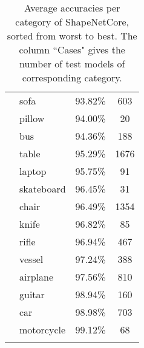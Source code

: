 \begin{table}[]
\begin{tabular}[t]{llcc}
		             & sofa              & 93.82\%           & 603            \\
		             & pillow            & 94.00\%           & 20             \\
		             & bus               & 94.36\%           & 188            \\
		             & table             & 95.29\%           & 1676           \\
		             & laptop            & 95.75\%           & 91             \\
		             & skateboard        & 96.45\%           & 31             \\
		             & chair             & 96.49\%           & 1354           \\
		             & knife             & 96.82\%           & 85             \\
		             & rifle             & 96.94\%           & 467            \\
		             & vessel            & 97.24\%           & 388            \\
		             & airplane          & 97.56\%           & 810            \\
		             & guitar            & 98.94\%           & 160            \\
		             & car               & 98.98\%           & 703            \\
		             & motorcycle        & 99.12\%           & 68             \\
		             &                   &                   &                \\ \hline
	\end{tabular}
	
	\caption{Average accuracies per category of ShapeNetCore, sorted from worst to best. The column ``Cases" gives the number of test models of corresponding category.}
	\label{Table:cataccs}
\end{table}